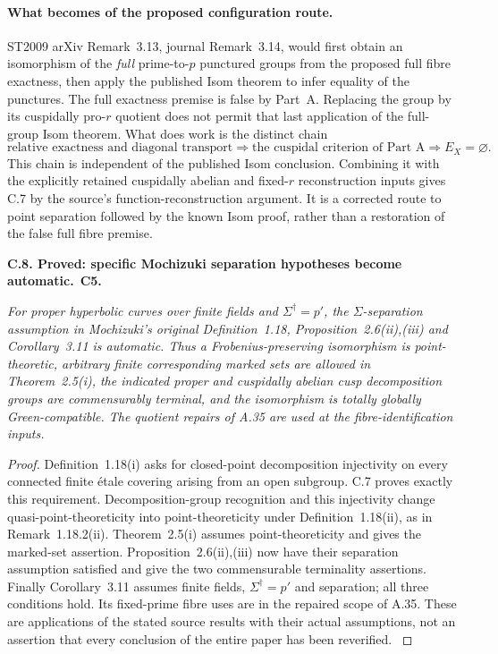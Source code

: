 \documentclass[11pt,a4paper]{article}
\newenvironment{claim}[3]{\par\medskip\noindent\hypertarget{#1}{\textbf{#1. #2.}}\ \textbf{#3.}\par\nopagebreak\smallskip\begingroup\itshape}{\endgroup\par\smallskip}
\begin{document}
\paragraph{What becomes of the proposed configuration route.}
ST2009 arXiv Remark~3.13, journal Remark~3.14, would first obtain
an isomorphism of the \emph{full} prime-to-$p$ punctured groups
from the proposed full fibre exactness, then apply the published
Isom theorem to infer equality of the punctures. The full
exactness premise is false by Part~A. Replacing the group by its
cuspidally pro-$r$ quotient does not permit that last application
of the full-group Isom theorem. What does work is the distinct
chain
\[
 \text{relative exactness and diagonal transport}
 \Longrightarrow
 \text{the cuspidal criterion of Part A}
 \Longrightarrow E_X=\varnothing.
\]
This chain is independent of the published Isom conclusion.
Combining it with the explicitly retained cuspidally abelian
and fixed-$r$ reconstruction inputs gives C.7 by the source's
function-reconstruction argument. It is a corrected route to
point separation followed by the known Isom proof, rather than
a restoration of the false full fibre premise.

\begin{claim}{C.8}{Proved: specific Mochizuki separation hypotheses become automatic}{C5}
For proper hyperbolic curves over finite fields and
$\Sigma^\dagger=p'$, the $\Sigma$-separation assumption in
Mochizuki's original Definition~1.18, Proposition~2.6(ii),(iii)
and Corollary~3.11 is automatic. Thus a Frobenius-preserving
isomorphism is point-theoretic, arbitrary finite corresponding
marked sets are allowed in Theorem~2.5(i), the indicated proper
and cuspidally abelian cusp decomposition groups are
commensurably terminal, and the isomorphism is totally globally
Green-compatible. The quotient repairs of A.35
are used at the fibre-identification inputs.
\end{claim}
\begin{proof}
Definition~1.18(i) asks for closed-point decomposition
injectivity on every connected finite \'etale covering arising
from an open subgroup. C.7 proves exactly this requirement.
Decomposition-group recognition and this injectivity change
quasi-point-theoreticity into point-theoreticity under
Definition~1.18(ii), as in Remark~1.18.2(ii). Theorem~2.5(i)
assumes point-theoreticity and gives the marked-set assertion.
Proposition~2.6(ii),(iii) now have their separation assumption
satisfied and give the two commensurable terminality assertions.
Finally Corollary~3.11 assumes finite fields,
$\Sigma^\dagger=p'$ and separation; all three conditions hold.
Its fixed-prime fibre uses are in the repaired scope of A.35.
These are applications of the stated source results with their
actual assumptions, not an assertion that every conclusion of
the entire paper has been reverified.
\citep[Definition~1.18, Remark~1.18.2, Theorem~2.5(i),
Proposition~2.6(ii),(iii), Corollary~3.11]{LA_Mochizuki2007}
\end{proof}
\end{document}
